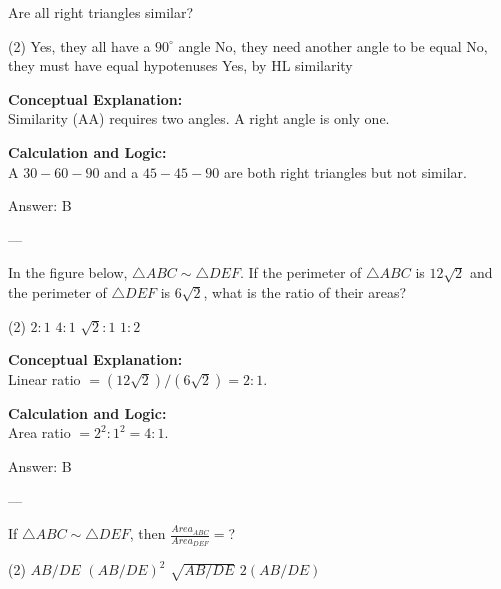 \documentclass[11pt,paper=a4,answers]{exam}
\begin{document}
\begin{questions}
\question
Are all right triangles similar?
\begin{tasks}(2)
    \task Yes, they all have a $90^\circ$ angle
    \task No, they need another angle to be equal
    \task No, they must have equal hypotenuses
    \task Yes, by HL similarity
\end{tasks}

\begin{solution}
\textbf{Conceptual Explanation:} \\
Similarity (AA) requires two angles. A right angle is only one.

\vspace{10pt}
\textbf{Calculation and Logic:} \\
A $30-60-90$ and a $45-45-90$ are both right triangles but not similar.

\vspace{15pt}
Answer: \colorbox{yellow!100}{B}
\end{solution}

---

\question
In the figure below, $\triangle ABC \sim \triangle DEF$. If the perimeter of $\triangle ABC$ is $12\sqrt{2}$ and the perimeter of $\triangle DEF$ is $6\sqrt{2}$, what is the ratio of their areas?
\begin{tasks}(2)
    \task $2:1$
    \task $4:1$
    \task $\sqrt{2}:1$
    \task $1:2$
\end{tasks}

\begin{solution}
\textbf{Conceptual Explanation:} \\
Linear ratio $= (12\sqrt{2})/(6\sqrt{2}) = 2:1$.

\vspace{10pt}
\textbf{Calculation and Logic:} \\
Area ratio $= 2^2 : 1^2 = 4:1$.

\vspace{15pt}
Answer: \colorbox{yellow!100}{B}
\end{solution}

---

\question
If $\triangle ABC \sim \triangle DEF$, then $\frac{Area_{ABC}}{Area_{DEF}} = $?
\begin{tasks}(2)
    \task $AB/DE$
    \task $(AB/DE)^2$
    \task $\sqrt{AB/DE}$
    \task $2(AB/DE)$
\end{tasks}


\end{questions}
\end{document}
